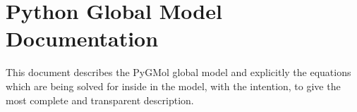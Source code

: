 \documentclass[12pt,a4paper]{article}
\begin{document}
\section*{Python Global Model Documentation}

This document describes the PyGMol global model and explicitly the equations which are being solved for inside in the
model, with the intention, to give the most complete and transparent description.

\tableofcontents
\newpage






\end{document}
